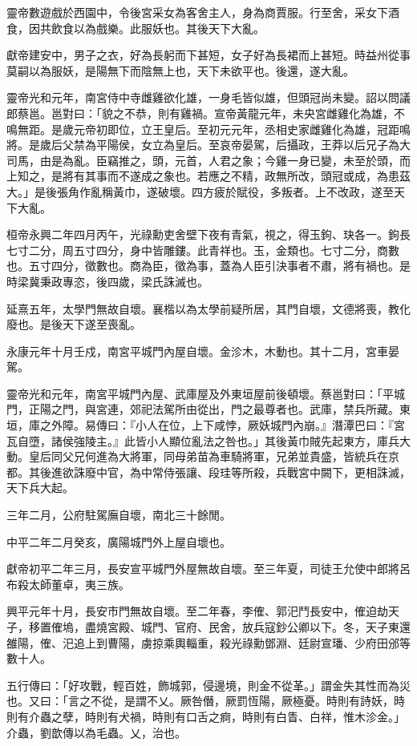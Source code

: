 \begin{pinyinscope}
靈帝數遊戲於西園中，令後宮采女為客舍主人，身為商賈服。行至舍，采女下酒食，因共飲食以為戲樂。此服妖也。其後天下大亂。

獻帝建安中，男子之衣，好為長躬而下甚短，女子好為長裙而上甚短。時益州從事莫嗣以為服妖，是陽無下而陰無上也，天下未欲平也。後還，遂大亂。

靈帝光和元年，南宮侍中寺雌雞欲化雄，一身毛皆似雄，但頭冠尚未變。詔以問議郎蔡邕。邕對曰：「貌之不恭，則有雞禍。宣帝黃龍元年，未央宮雌雞化為雄，不鳴無距。是歲元帝初即位，立王皇后。至初元元年，丞相史家雌雞化為雄，冠距鳴將。是歲后父禁為平陽侯，女立為皇后。至哀帝晏駕，后攝政，王莽以后兄子為大司馬，由是為亂。臣竊推之，頭，元首，人君之象；今雞一身已變，未至於頭，而上知之，是將有其事而不遂成之象也。若應之不精，政無所改，頭冠或成，為患茲大。」是後張角作亂稱黃巾，遂破壞。四方疲於賦役，多叛者。上不改政，遂至天下大亂。

桓帝永興二年四月丙午，光祿勳吏舍壁下夜有青氣，視之，得玉鉤、玦各一。鉤長七寸二分，周五寸四分，身中皆雕鏤。此青祥也。玉，金類也。七寸二分，商數也。五寸四分，徵數也。商為臣，徵為事，蓋為人臣引決事者不肅，將有禍也。是時梁冀秉政專恣，後四歲，梁氏誅滅也。

延熹五年，太學門無故自壞。襄楷以為太學前疑所居，其門自壞，文德將喪，教化廢也。是後天下遂至喪亂。

永康元年十月壬戍，南宮平城門內屋自壞。金沴木，木動也。其十二月，宮車晏駕。

靈帝光和元年，南宮平城門內屋、武庫屋及外東垣屋前後頓壞。蔡邕對曰：「平城門，正陽之門，與宮連，郊祀法駕所由從出，門之最尊者也。武庫，禁兵所藏。東垣，庫之外障。易傳曰：『小人在位，上下咸悖，厥妖城門內崩。』潛潭巴曰：『宮瓦自墮，諸侯強陵主。』此皆小人顯位亂法之咎也。」其後黃巾賊先起東方，庫兵大動。皇后同父兄何進為大將軍，同母弟苗為車騎將軍，兄弟並貴盛，皆統兵在京都。其後進欲誅廢中官，為中常侍張讓、段珪等所殺，兵戰宮中闕下，更相誅滅，天下兵大起。

三年二月，公府駐駕廡自壞，南北三十餘閒。

中平二年二月癸亥，廣陽城門外上屋自壞也。

獻帝初平二年三月，長安宣平城門外屋無故自壞。至三年夏，司徒王允使中郎將呂布殺太師董卓，夷三族。

興平元年十月，長安市門無故自壞。至二年春，李傕、郭汜鬥長安中，傕迫劫天子，移置傕塢，盡燒宮殿、城門、官府、民舍，放兵寇鈔公卿以下。冬，天子東還雒陽，傕、汜追上到曹陽，虜掠乘輿輜重，殺光祿勳鄧淵、廷尉宣璠、少府田邠等數十人。

五行傳曰：「好攻戰，輕百姓，飾城郭，侵邊境，則金不從革。」謂金失其性而為災也。又曰：「言之不從，是謂不乂。厥咎僭，厥罰恆陽，厥極憂。時則有詩妖，時則有介蟲之孽，時則有犬禍，時則有口舌之痾，時則有白眚、白祥，惟木沴金。」介蟲，劉歆傳以為毛蟲。乂，治也。


\end{pinyinscope}
